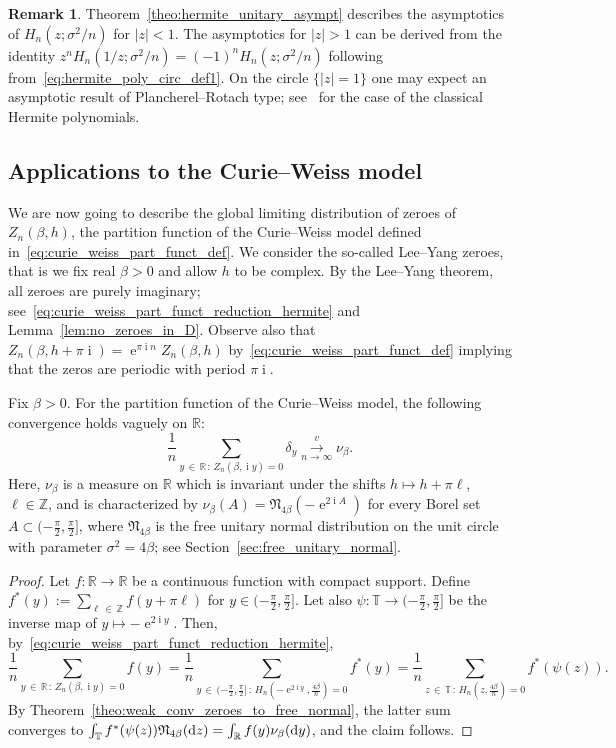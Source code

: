 \documentclass[10pt]{amsart}
\theoremstyle{definition}\newtheorem{defi}[theo]{Definition}\newtheorem{rema}[theo]{Remark}\newtheorem{exam}[theo]{Example}\newtheorem{exem}[theo]{Example}\newtheorem{nota}[theo]{Notation}
\DeclareMathOperator{\eee}{e}
\DeclareMathOperator{\ii}{i}
\newcommand{\fnorm}{\mathfrak{N}}
\newcommand{\bT}{\mathbb{T}}
\newcommand{\R}{\mathbb{R}}
\newcommand{\Z}{\mathbb{Z}}
\newcommand*\dint{\text{\normalfont d}}
\newcommand{\tovague}{\overset{v}{\underset{n\to\infty}\longrightarrow}}
\begin{document}
\begin{rema}
Theorem~\ref{theo:hermite_unitary_asympt} describes the asymptotics of $H_n(z;\sigma^2/n)$ for $|z|<1$. The asymptotics for $|z|>1$ can be derived from the identity $z^n H_n(1/z; \sigma^2/n) = (-1)^n H_n(z; \sigma^2/n)$ following from~\eqref{eq:hermite_poly_circ_def1}. On the circle $\{|z|=1\}$ one may expect an asymptotic result of Plancherel--Rotach type; see~\cite[Theorem~8.22.9]{szegoe_book} for the case of the classical Hermite polynomials.
\end{rema}

\subsection{Applications to the Curie--Weiss model}

We are now going to describe the global limiting distribution of zeroes of $Z_n(\beta, h)$, the partition function of the Curie--Weiss model defined in~\eqref{eq:curie_weiss_part_funct_def}. We consider the so-called Lee--Yang zeroes, that is we fix real $\beta>0$ and allow $h$ to be complex. By the Lee--Yang theorem, all zeroes are purely imaginary; see~\eqref{eq:curie_weiss_part_funct_reduction_hermite} and Lemma~\ref{lem:no_zeroes_in_D}. Observe also that $Z_n(\beta, h +\pi \ii) =
\eee^{\pi \ii n} Z_n(\beta, h)$ by~\eqref{eq:curie_weiss_part_funct_def} implying that the zeros are periodic with period $\pi \ii$.

\begin{coro}\label{cor:curie_weiss_zeroes}
Fix $\beta>0$. For the partition function of the Curie--Weiss model, the following convergence holds vaguely on $\R$:
\[
\frac 1n \sum_{y\,\in\,\R\,:\, Z_n(\beta, \ii y) = 0} \delta_{y} \tovague \nu_{\beta}.
\]
Here, $\nu_\beta$ is a measure on $\R$ which is invariant under the shifts $h\mapsto h + \pi \ell$, $\ell\in \Z$, and is characterized by $\nu_\beta(A) = \fnorm_{4\beta} (- \eee^{2 \ii A})$ for every Borel set $A\subset (-\frac{\pi}{2}, \frac{\pi}{2}]$, where $\fnorm_{4\beta}$ is the free unitary normal distribution on the unit circle with parameter $\sigma^2 = 4\beta$; see Section~\ref{sec:free_unitary_normal}.
\end{coro}

\begin{proof}
Let $f:\R \to \R$ be a continuous function with compact support. Define $f^*(y):= \sum_{\ell\,\in\,\Z} f(y + \pi \ell)$ for $y\in (-\frac{\pi}{2}, \frac{\pi}{2}]$. Let also $\psi: \bT \to (-\frac{\pi}{2}, \frac{\pi}{2}]$ be the inverse map of $y\mapsto -\eee^{2\ii y}$. Then, by~\eqref{eq:curie_weiss_part_funct_reduction_hermite},
\[
\frac 1n \sum_{y\,\in\,\R\,:\, Z_n(\beta, \ii y) = 0} f(y) =
\frac 1n \sum_{y\,\in\,(-\frac{\pi}{2}, \frac{\pi}{2}]\,:\, H_n\left(-\eee^{2\ii y}, \frac{4\beta}{n}\right) = 0} f^*(y) =
\frac 1n \sum_{z\,\in\,\bT\,:\, H_n\left(z, \frac{4\beta}{n}\right) = 0} f^*(\psi(z)).
\]
By Theorem~\ref{theo:weak_conv_zeroes_to_free_normal}, the latter sum converges to $\int_{\bT} f^*(\psi(z))\fnorm_{4\beta}(\dint z) = \int_{\R} f(y)\nu_{\beta}(\dint y)$, and the claim follows.
\end{proof}
\end{document}
